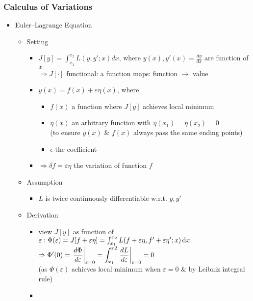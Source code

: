 \subsubsection{Calculus of Variations} \label{math_calc_var}
\begin{itemize}
\item Euler–Lagrange Equation
	\begin{itemize}
	\item Setting
		\begin{itemize}
		\item $\displaystyle J[y]=\int_{x_1}^{x_2}L(y, y';x)dx$, where $y(x), y'(x)=\frac{dy}{dx}$ are function of $x$ \\
		$\Rightarrow J[\cdot]$ functional: a function maps: function $\rightarrow$ value
		\item $y(x) = f(x) + \varepsilon \eta(x)$, where
			\begin{itemize}
			\item $f(x)$ a function where $J[y]$ achieves local minimum
			\item $\eta(x)$ an arbitrary function with $\eta(x_1)=\eta(x_2)=0$ \\
			(to ensure $y(x)$ \& $f(x)$ always pass the same ending points)
			\item $\epsilon$ the coefficient
			\end{itemize}
		\item $\Rightarrow \delta f = \varepsilon \eta$ the variation of function $f$
		\end{itemize}
	\item Assumption
		\begin{itemize}
		\item $L$ is twice continuously differentiable w.r.t. $y, y'$
		\end{itemize}
	\item Derivation
		\begin{itemize}
		\item view $J[y]$ as function of $\varepsilon: \Phi(\varepsilon) = J[f+\varepsilon\eta] = \int_{x_1}^{x_2}L(f+\varepsilon\eta, f'+\varepsilon\eta';x) \mathop{}\!\mathrm{d} x$ \\
		$\displaystyle \Rightarrow \Phi'(0) = \left.\frac{d\Phi}{d\varepsilon}\right|_{\varepsilon=0} = \int_{x_1}^{x2}\left.\frac{dL}{d\varepsilon}\right|_{\varepsilon=0} = 0$ \\
		(as $\Phi(\varepsilon)$ achieves local minimum when $\varepsilon=0$ \& by Leibniz integral rule)
		\item \abovedisplayskip=2pt\abovedisplayshortskip=2pt~\vspace*{-\baselineskip}

\end{itemize}
\end{itemize}
\end{itemize}
